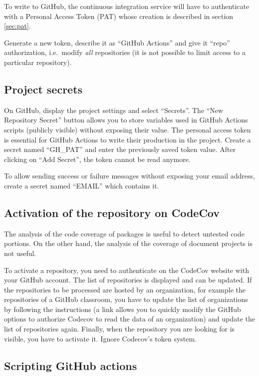 \documentclass[
  12pt,
  american,
  a4paper,
  extrafontsizes,onecolumn,openright
  ]{memoir}
\begin{document}
To write to GitHub, the continuous integration service will have to authenticate with a Personal Access Token (PAT) whose creation is described in section \ref{sec:pat}.

Generate a new token, describe it as \enquote{GitHub Actions} and give it \enquote{repo} authorization, i.e.~modify \emph{all} repositories (it is not possible to limit access to a particular repository).

\subsection{Project secrets}\label{sec:secrets-ci}

On GitHub, display the project settings and select \enquote{Secrets}.
The \enquote{New Repository Secret} button allows you to store variables used in GitHub Actions scripts (publicly visible) without exposing their value.
The personal access token is essential for GitHub Actions to write their production in the project.
Create a secret named \enquote{GH\_PAT} and enter the previously saved token value.
After clicking on \enquote{Add Secret}, the token cannot be read anymore.

To allow sending success or failure messages without exposing your email address, create a secret named \enquote{EMAIL} which contains it.

\subsection{Activation of the repository on CodeCov}\label{activation-of-the-repository-on-codecov}

The analysis of the code coverage of packages is useful to detect untested code portions.
On the other hand, the analysis of the coverage of document projects is not useful.

To activate a repository, you need to authenticate on the CodeCov website with your GitHub account.
The list of repositories is displayed and can be updated.
If the repositories to be processed are hosted by an organization, for example the repositories of a GitHub classroom, you have to update the list of organizations by following the instructions (a link allows you to quickly modify the GitHub options to authorize Codecov to read the data of an organization) and update the list of repositories again.
Finally, when the repository you are looking for is visible, you have to activate it.
Ignore Codecov's token system.

\subsection{Scripting GitHub actions}\label{scripting-github-actions}
\end{document}
